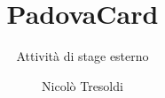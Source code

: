 \documentclass[a4paper]{article}
\title{PadovaCard}
\subtitle{Attività di stage esterno}
\author{Nicolò Tresoldi}
\begin{document}
%
%
\maketitle

\tableofcontents

\listoftables

\listoffigures



%
%
%  
%

\appendix
\addappheadtotoc
\setcounter{table}{0}
\renewcommand{\thetable}{A.\arabic{table}}
%
%  
\end{document}
